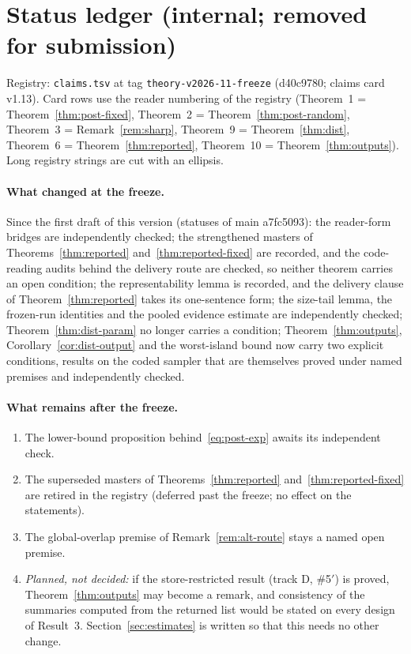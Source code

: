 \ifshowstatus
\section{Status ledger (internal; removed for submission)}\label{app:status}

Registry: \texttt{claims.tsv} at tag \texttt{theory-v2026-11-freeze} (d40c9780; claims card v1.13). Card rows use the
reader numbering of the registry (Theorem~1 = Theorem~\ref{thm:post-fixed}, Theorem~2 = Theorem~\ref{thm:post-random},
Theorem~3 = Remark~\ref{rem:sharp}, Theorem~9 = Theorem~\ref{thm:dist}, Theorem~6 = Theorem~\ref{thm:reported},
Theorem~10 = Theorem~\ref{thm:outputs}). Long registry strings are cut with an ellipsis.


\paragraph{What changed at the freeze.} Since the first draft of this version (statuses of main a7fc5093): the
reader-form bridges are independently checked; the strengthened masters of Theorems~\ref{thm:reported}
and~\ref{thm:reported-fixed} are recorded, and the code-reading audits behind the delivery route are checked, so neither
theorem carries an open condition; the representability lemma is recorded, and the delivery clause of
Theorem~\ref{thm:reported} takes its one-sentence form; the size-tail lemma, the frozen-run identities and the pooled
evidence estimate are independently checked; Theorem~\ref{thm:dist-param} no longer carries a condition;
Theorem~\ref{thm:outputs}, Corollary~\ref{cor:dist-output} and the worst-island bound now carry two explicit conditions,
results on the coded sampler that are themselves proved under named premises and independently checked.

\paragraph{What remains after the freeze.}
\begin{enumerate}[leftmargin=1.5em,itemsep=1pt]
  \item The lower-bound proposition behind~\eqref{eq:post-exp} awaits its independent check.
  \item The superseded masters of Theorems~\ref{thm:reported} and~\ref{thm:reported-fixed} are retired in the registry
    (deferred past the freeze; no effect on the statements).
  \item The global-overlap premise of Remark~\ref{rem:alt-route} stays a named open premise.
  \item \emph{Planned, not decided:} if the store-restricted result (track D, \#5$'$) is proved, Theorem~\ref{thm:outputs}
    may become a remark, and consistency of the summaries computed from the returned list would be stated on every
    design of Result~3. Section~\ref{sec:estimates} is written so that this needs no other change.
\end{enumerate}
\fi
